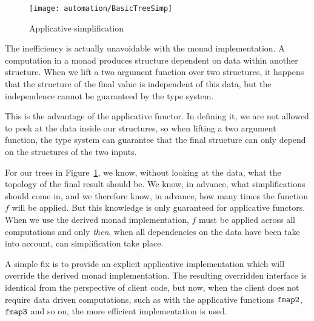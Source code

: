 \begin{figure}
\centering\texttt{[image: automation/BasicTreeSimp]}
\caption{Applicative simplification}
\label{fig:ApplicativeSimp}
\end{figure}

The inefficiency is actually unavoidable with the monad implementation. A computation in a monad produces structure dependent on data within another structure. When we lift a two argument function over two structures, it happens that the structure of the final value is independent of this data, but the independence cannot be guaranteed by the type system.

This is the advantage of the applicative functor. In defining it, we are not allowed to peek at the data inside our structures, so when lifting a two argument function, the type system can guarantee that the final structure can only depend on the structures of the two inputs. 

For our trees in Figure~\ref{fig:ApplicativeSimp}, we know, without looking at the data, what the topology of the final result should be. We know, in advance, what simplifications should come in, and we therefore know, in advance, how many times the function $f$ will be applied. But this knowledge is only guaranteed for applicative functors. When we use the derived monad implementation, $f$ must be applied across all computations and only \emph{then}, when all dependencies on the data have been take into account,  can simplification take place.

A simple fix is to provide an explicit applicative implementation which will override the derived monad implementation. The resulting overridden interface is identical from the perspective of client code, but now, when the client does not require data driven computations, such as with the applicative functions $\texttt{fmap2}$, $\texttt{fmap3}$ and so on, the more efficient implementation is used.

